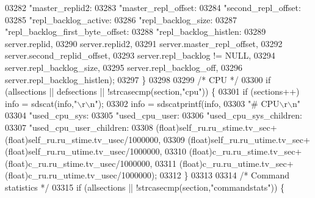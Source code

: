 \begin{DoxyCode}
{{{{{{{{{{{{{{{{{{{{{{{{{{{{{{{{{{{{{{{{{{{{{{{{{{{{{{{{{{{{{{{{{{{{{{{{{{{{{{{{{{{{{{{{{{{{{{{{{{{{{{{{{{{{{{{{{{{{{{{{{{{{{{{{{{{{{{{{{{{{{{{{{{{{{{{{{{{03282             \textcolor{stringliteral}{"master\_replid2:%
03283             \textcolor{stringliteral}{"master\_repl\_offset:%
03284             \textcolor{stringliteral}{"second\_repl\_offset:%
03285             \textcolor{stringliteral}{"repl\_backlog\_active:%
03286             \textcolor{stringliteral}{"repl\_backlog\_size:%
03287             \textcolor{stringliteral}{"repl\_backlog\_first\_byte\_offset:%
03288             \textcolor{stringliteral}{"repl\_backlog\_histlen:%
03289             server.replid,
03290             server.replid2,
03291             server.master\_repl\_offset,
03292             server.second\_replid\_offset,
03293             server.repl\_backlog != NULL,
03294             server.repl\_backlog\_size,
03295             server.repl\_backlog\_off,
03296             server.repl\_backlog\_histlen);
03297     \}
03298 
03299     \textcolor{comment}{/* CPU */}
03300     \textcolor{keywordflow}{if} (allsections || defsections || !strcasecmp(section,\textcolor{stringliteral}{"cpu"})) \{
03301         \textcolor{keywordflow}{if} (sections++) info = sdscat(info,\textcolor{stringliteral}{"\(\backslash\)r\(\backslash\)n"});
03302         info = sdscatprintf(info,
03303         \textcolor{stringliteral}{"# CPU\(\backslash\)r\(\backslash\)n"}
03304         \textcolor{stringliteral}{"used\_cpu\_sys:%
03305         \textcolor{stringliteral}{"used\_cpu\_user:%
03306         \textcolor{stringliteral}{"used\_cpu\_sys\_children:%
03307         \textcolor{stringliteral}{"used\_cpu\_user\_children:%
03308         (\textcolor{keywordtype}{float})self\_ru.ru\_stime.tv\_sec+(\textcolor{keywordtype}{float})self\_ru.ru\_stime.tv\_usec/1000000,
03309         (\textcolor{keywordtype}{float})self\_ru.ru\_utime.tv\_sec+(\textcolor{keywordtype}{float})self\_ru.ru\_utime.tv\_usec/1000000,
03310         (\textcolor{keywordtype}{float})c\_ru.ru\_stime.tv\_sec+(\textcolor{keywordtype}{float})c\_ru.ru\_stime.tv\_usec/1000000,
03311         (\textcolor{keywordtype}{float})c\_ru.ru\_utime.tv\_sec+(\textcolor{keywordtype}{float})c\_ru.ru\_utime.tv\_usec/1000000);
03312     \}
03313 
03314     \textcolor{comment}{/* Command statistics */}
03315     \textcolor{keywordflow}{if} (allsections || !strcasecmp(section,\textcolor{stringliteral}{"commandstats"})) \{
}}}}}}}}}}}}}}}}}}}}}}}}}}}}}}}}}}}}}}}}}}}}}}}}}}}}}}}}}}}}}}}}}}}}}}}}}}}}}}}}}}}}}}}}}}}}}}}}}}}}}}}}}}}}}}}}}}}}}}}}}}}}}}}}}}}}}}}}}}}}}}}}}}}}}}}}}}}}}}}}}}}}}}
\end{DoxyCode}
